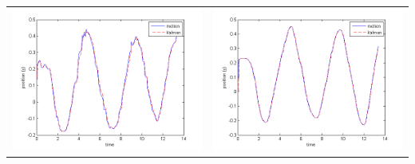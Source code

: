 \documentclass[8pt,sans,mathserif]{beamer}%
\begin{document}
\begin{frame}
\begin{columns}
\begin{tabular}{cc}
            \includegraphics[height = 0.30\textheight, keepaspectratio]{fig/filter0-y.png} & \includegraphics[height = 0.30\textheight, keepaspectratio]{fig/filter3-y.png}\\

\end{tabular}
\end{columns}
\end{frame}
\end{document}

